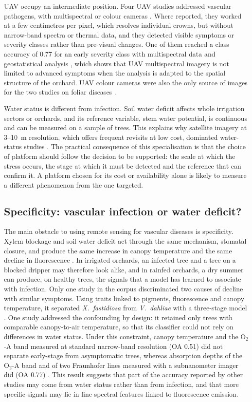 \documentclass[preprint,12pt]{elsarticle}
\begin{document}
UAV occupy an intermediate position. Four UAV studies addressed vascular pathogens, with multispectral or colour cameras \citep{u013,u021,u036,u055}. Where reported, they worked at a few centimetres per pixel, which resolves individual crowns, but without narrow-band spectra or thermal data, and they detected visible symptoms or severity classes rather than pre-visual changes. One of them reached a class accuracy of 0.77 for an early severity class with multispectral data and geostatistical analysis \citep{u036}, which shows that UAV multispectral imagery is not limited to advanced symptoms when the analysis is adapted to the spatial structure of the orchard. UAV colour cameras were also the only source of images for the two studies on foliar diseases \citep{u046,u080}.

Water status is different from infection. Soil water deficit affects whole irrigation sectors or orchards, and its reference variable, stem water potential, is continuous and can be measured on a sample of trees. This explains why satellite imagery at 3--10~m resolution, which offers frequent revisits at low cost, dominated water-status studies \citep{u081,u106,u108,u133}. The practical consequence of this specialisation is that the choice of platform should follow the decision to be supported: the scale at which the stress occurs, the stage at which it must be detected and the reference that can confirm it. A platform chosen for its cost or availability alone is likely to measure a different phenomenon from the one targeted.

\subsection{Specificity: vascular infection or water deficit?}\label{sec:disc_specificity}
The main obstacle to using remote sensing for vascular diseases is specificity. Xylem blockage and soil water deficit act through the same mechanism, stomatal closure, and produce the same increase in canopy temperature and the same decline in fluorescence \citep{u030,Kuska2018Aiming}. In irrigated orchards, an infected tree and a tree on a blocked dripper may therefore look alike, and in rainfed orchards, a dry summer can produce, on healthy trees, the signals that a model has learned to associate with infection. Only one study in the corpus discriminated two causes of decline with similar symptoms. Using traits linked to pigments, fluorescence and canopy temperature, it separated \textit{X.~fastidiosa} from \textit{V.~dahliae} with a three-stage model \citep{u030}. One study addressed the confounding by design: it retained only trees with comparable canopy-to-air temperature, so that its classifier could not rely on differences in water status. Under this constraint, canopy temperature and the O$_2$-A band measured at standard narrow-band resolution (OA 0.51) did not separate early-stage from asymptomatic trees, whereas absorption depths of the O$_2$-A band and of two Fraunhofer lines measured with a subnanometer imager did (OA 0.77) \citep{u121}. This result suggests that part of the accuracy reported by other studies may come from water status rather than from infection, and that more specific signals may lie in fine spectral features linked to fluorescence emission.
\end{document}

